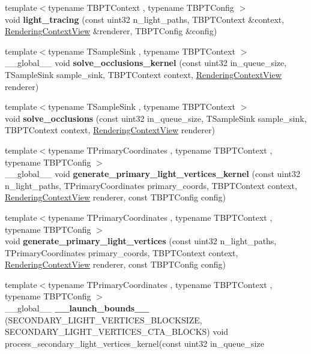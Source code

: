 \begin{DoxyCompactItemize}
\item 
{\footnotesize template$<$typename T\+B\+P\+T\+Context , typename T\+B\+P\+T\+Config $>$ }\\void {\bfseries light\+\_\+tracing} (const uint32 n\+\_\+light\+\_\+paths, T\+B\+P\+T\+Context \&context, \hyperlink{struct_rendering_context_view}{Rendering\+Context\+View} \&renderer, T\+B\+P\+T\+Config \&config)
\item 
{\footnotesize template$<$typename T\+Sample\+Sink , typename T\+B\+P\+T\+Context $>$ }\\\+\_\+\+\_\+global\+\_\+\+\_\+ void {\bfseries solve\+\_\+occlusions\+\_\+kernel} (const uint32 in\+\_\+queue\+\_\+size, T\+Sample\+Sink sample\+\_\+sink, T\+B\+P\+T\+Context context, \hyperlink{struct_rendering_context_view}{Rendering\+Context\+View} renderer)
\item 
{\footnotesize template$<$typename T\+Sample\+Sink , typename T\+B\+P\+T\+Context $>$ }\\void {\bfseries solve\+\_\+occlusions} (const uint32 in\+\_\+queue\+\_\+size, T\+Sample\+Sink sample\+\_\+sink, T\+B\+P\+T\+Context context, \hyperlink{struct_rendering_context_view}{Rendering\+Context\+View} renderer)
\item 
{\footnotesize template$<$typename T\+Primary\+Coordinates , typename T\+B\+P\+T\+Context , typename T\+B\+P\+T\+Config $>$ }\\\+\_\+\+\_\+global\+\_\+\+\_\+ void {\bfseries generate\+\_\+primary\+\_\+light\+\_\+vertices\+\_\+kernel} (const uint32 n\+\_\+light\+\_\+paths, T\+Primary\+Coordinates primary\+\_\+coords, T\+B\+P\+T\+Context context, \hyperlink{struct_rendering_context_view}{Rendering\+Context\+View} renderer, const T\+B\+P\+T\+Config config)
\item 
{\footnotesize template$<$typename T\+Primary\+Coordinates , typename T\+B\+P\+T\+Context , typename T\+B\+P\+T\+Config $>$ }\\void {\bfseries generate\+\_\+primary\+\_\+light\+\_\+vertices} (const uint32 n\+\_\+light\+\_\+paths, T\+Primary\+Coordinates primary\+\_\+coords, T\+B\+P\+T\+Context context, \hyperlink{struct_rendering_context_view}{Rendering\+Context\+View} renderer, const T\+B\+P\+T\+Config config)
\item 
{\footnotesize template$<$typename T\+Primary\+Coordinates , typename T\+B\+P\+T\+Context , typename T\+B\+P\+T\+Config $>$ }\\\+\_\+\+\_\+global\+\_\+\+\_\+ {\bfseries \+\_\+\+\_\+launch\+\_\+bounds\+\_\+\+\_\+} (S\+E\+C\+O\+N\+D\+A\+R\+Y\+\_\+\+L\+I\+G\+H\+T\+\_\+\+V\+E\+R\+T\+I\+C\+E\+S\+\_\+\+B\+L\+O\+C\+K\+S\+I\+ZE, S\+E\+C\+O\+N\+D\+A\+R\+Y\+\_\+\+L\+I\+G\+H\+T\+\_\+\+V\+E\+R\+T\+I\+C\+E\+S\+\_\+\+C\+T\+A\+\_\+\+B\+L\+O\+C\+KS) void process\+\_\+secondary\+\_\+light\+\_\+vertices\+\_\+kernel(const uint32 in\+\_\+queue\+\_\+size

\end{DoxyCompactItemize}

